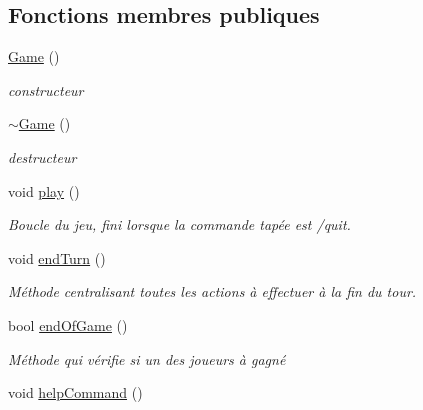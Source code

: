 \subsection*{Fonctions membres publiques}
\begin{DoxyCompactItemize}
\item 
\hypertarget{classGame_ad59df6562a58a614fda24622d3715b65}{\hyperlink{classGame_ad59df6562a58a614fda24622d3715b65}{Game} ()}\label{classGame_ad59df6562a58a614fda24622d3715b65}

\begin{DoxyCompactList}\small\item\em constructeur \end{DoxyCompactList}\item 
\hypertarget{classGame_ae3d112ca6e0e55150d2fdbc704474530}{\hyperlink{classGame_ae3d112ca6e0e55150d2fdbc704474530}{$\sim$\+Game} ()}\label{classGame_ae3d112ca6e0e55150d2fdbc704474530}

\begin{DoxyCompactList}\small\item\em destructeur \end{DoxyCompactList}\item 
\hypertarget{classGame_aa333825d0bca80e91e53c7e23f053405}{void \hyperlink{classGame_aa333825d0bca80e91e53c7e23f053405}{play} ()}\label{classGame_aa333825d0bca80e91e53c7e23f053405}

\begin{DoxyCompactList}\small\item\em Boucle du jeu, fini lorsque la commande tapée est /quit. \end{DoxyCompactList}\item 
\hypertarget{classGame_a987b5442cddbc9376b7fe55a9fcbd42e}{void \hyperlink{classGame_a987b5442cddbc9376b7fe55a9fcbd42e}{end\+Turn} ()}\label{classGame_a987b5442cddbc9376b7fe55a9fcbd42e}

\begin{DoxyCompactList}\small\item\em Méthode centralisant toutes les actions à effectuer à la fin du tour. \end{DoxyCompactList}\item 
\hypertarget{classGame_a217c5bd3b04bcf146b312cb17e2621e3}{bool \hyperlink{classGame_a217c5bd3b04bcf146b312cb17e2621e3}{end\+Of\+Game} ()}\label{classGame_a217c5bd3b04bcf146b312cb17e2621e3}

\begin{DoxyCompactList}\small\item\em Méthode qui vérifie si un des joueurs à gagné \end{DoxyCompactList}\item 
\hypertarget{classGame_a2f6be379e2d5bc1cce58f1ec96422ba8}{void \hyperlink{classGame_a2f6be379e2d5bc1cce58f1ec96422ba8}{help\+Command} ()}\label{classGame_a2f6be379e2d5bc1cce58f1ec96422ba8}


\end{DoxyCompactItemize}
